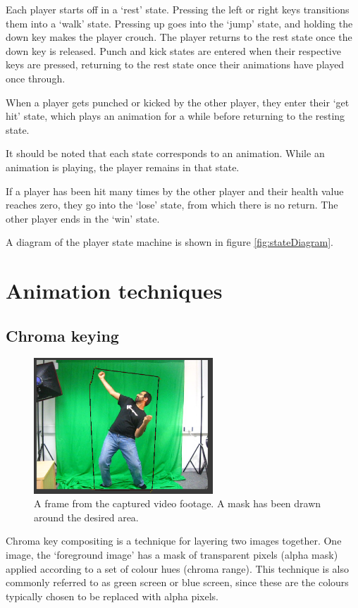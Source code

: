 \documentclass[11pt]{article}
\begin{document}
Each player starts off in a `rest' state. Pressing the left or right keys transitions them into a `walk' state. Pressing up goes into the `jump' state, and holding the down key makes the player crouch. The player returns to the rest state once the down key is released. Punch and kick states are entered when their respective keys are pressed, returning to the rest state once their animations have played once through.

When a player gets punched or kicked by the other player, they enter their `get hit' state, which plays an animation for a while before returning to the resting state.

It should be noted that each state corresponds to an animation. While an animation is playing, the player remains in that state.

If a player has been hit many times by the other player and their health value reaches zero, they go into the `lose' state, from which there is no return. The other player ends in the `win' state.

A diagram of the player state machine is shown in figure \ref{fig:stateDiagram}.

\section{Animation techniques}
\subsection{Chroma keying}\label{sec:chroma}
\begin{figure}[tp]
\centering
\includegraphics[width=0.6\textwidth]{mask.png}
\caption{A frame from the captured video footage. A mask has been drawn around the desired area.}
\label{fig:mask}
\end{figure}

Chroma key compositing is a technique for layering two images together. One image, the `foreground image' has a mask of transparent pixels (alpha mask) applied according to a set of colour hues (chroma range). This technique is also commonly referred to as green screen or blue screen, since these are the colours typically chosen to be replaced with alpha pixels.
\end{document}
